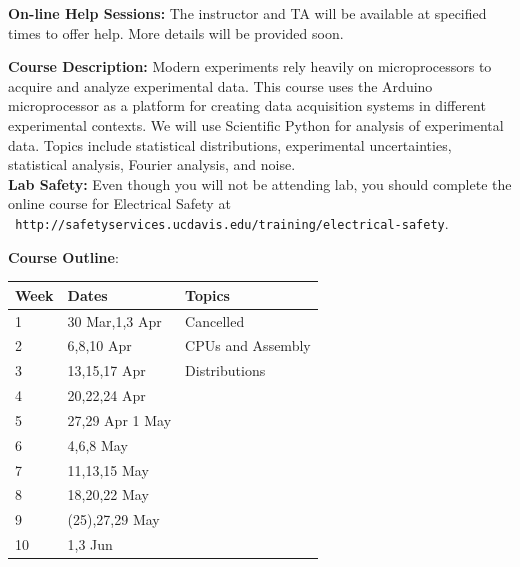\documentclass[12pt]{article}
\begin{document}
\noindent
\textbf {On-line Help Sessions:}
The instructor and TA will be available at specified times to offer
help.  More details will be provided soon.

\noindent
\textbf {Course Description:}
Modern experiments rely heavily on microprocessors to acquire and
analyze experimental data.  This course uses the Arduino
microprocessor as a platform for creating data acquisition systems in
different experimental contexts.  We will use Scientific Python for
analysis of experimental data.  Topics include statistical
distributions, experimental uncertainties, statistical analysis,
Fourier analysis, and noise.\\

\noindent
\textbf {Lab Safety:}
Even though you will not be attending lab, you should complete the
online course for Electrical Safety at \\ {\tt
  http://safetyservices.ucdavis.edu/training/electrical-safety}.\\

\begin{samepage}
\vskip 0.5cm
\noindent
\textbf {Course Outline}:

\begin{table}[h!]
\begin{tabular}{ lll }
\hline
\textbf{Week} & \textbf{Dates} & \textbf{Topics} \\
\hline
1 & 30 Mar,1,3 Apr & Cancelled \\
\hline
2 & 6,8,10 Apr & CPUs and Assembly  \\
\hline
3 & 13,15,17 Apr & Distributions \\
\hline
4 & 20,22,24 Apr &  \\
\hline
5 & 27,29 Apr 1 May & \\
\hline
6 & 4,6,8 May & \\
\hline
7 & 11,13,15 May & \\
\hline
8 & 18,20,22 May & \\
\hline
9 & (25),27,29 May &  \\
\hline
10 & 1,3 Jun &  \\
\hline
\end{tabular} 
\end{table}
\end{samepage}
\end{document}
